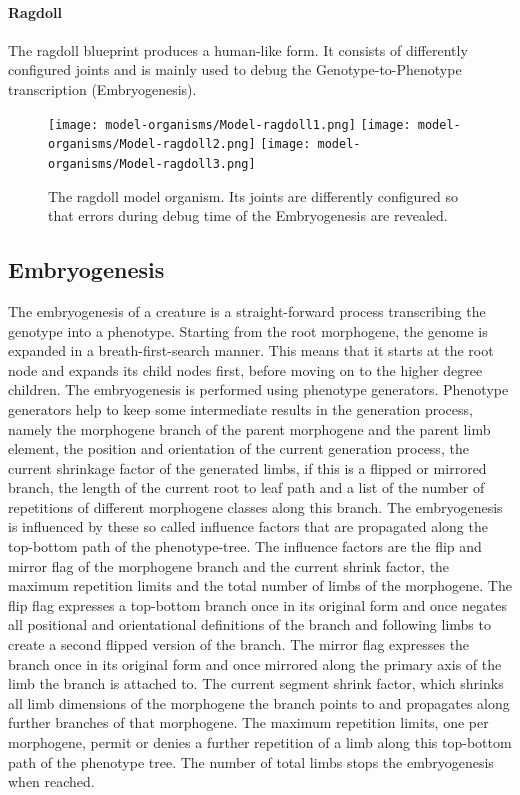 \documentclass[main]{subfiles}
\begin{document}
\paragraph{Ragdoll}

The ragdoll blueprint produces a human-like form. %
%
It consists of differently configured joints and is mainly used to debug the Genotype-to-Phenotype transcription (Embryogenesis).

\begin{figure}[H]
\centering
\texttt{[image: model-organisms/Model-ragdoll1.png]}
\texttt{[image: model-organisms/Model-ragdoll2.png]}
\texttt{[image: model-organisms/Model-ragdoll3.png]}
\caption[The ragdoll]{The ragdoll model organism. Its joints are differently configured so that errors during debug time of the Embryogenesis are revealed.}
\label{figure:ragdoll}
\end{figure}

\subsection{Embryogenesis}
\label{subsec:embryogenesis}

The embryogenesis of a creature is a straight-forward process transcribing the genotype into a phenotype. %
%
Starting from the root morphogene, the genome is expanded in a breath-first-search manner. %
%
This means that it starts at the root node and expands its child nodes first, before moving on to the higher degree children. %
%
The embryogenesis is performed using phenotype generators. %
%
Phenotype generators help to keep some intermediate results in the generation process, namely the morphogene branch of the parent morphogene and the parent limb element, the position and orientation of the current generation process, the current shrinkage factor of the generated limbs, if this is a flipped or mirrored branch, the length of the current root to leaf path and a list of the number of repetitions of different morphogene classes along this branch. %
%
The embryogenesis is influenced by these so called influence factors that are propagated along the top-bottom path of the phenotype-tree. %
%
The influence factors are the flip and mirror flag of the morphogene branch and the current shrink factor, the maximum repetition limits and the total number of limbs of the morphogene. %
%
The flip flag expresses a top-bottom branch once in its original form and once negates all positional and orientational definitions of the branch and following limbs to create a second flipped version of the branch. %
%
The mirror flag expresses the branch once in its original form and once mirrored along the primary axis of the limb the branch is attached to. %
%
The current segment shrink factor, which shrinks all limb dimensions of the morphogene the branch points to and propagates along further branches of that morphogene. %
%
The maximum repetition limits, one per morphogene, permit or denies a further repetition of a limb along this top-bottom path of the phenotype tree. %
%
The number of total limbs stops the embryogenesis when reached.
\end{document}
